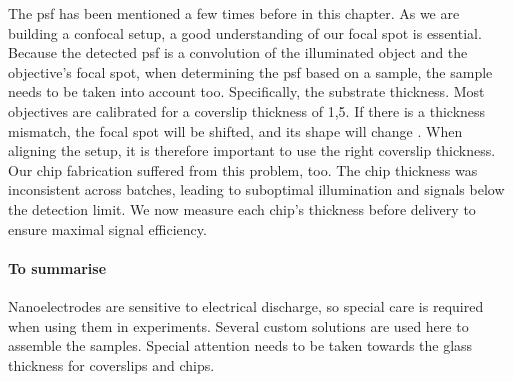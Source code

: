       
        The \gls{psf} has been mentioned a few times before in this chapter. As we are building a confocal setup, a good understanding of our focal spot is essential. Because the detected \gls{psf} is a convolution of the illuminated object and the objective's focal spot, when determining the \gls{psf} based on a sample, the sample needs to be taken into account too. Specifically, the substrate thickness. Most objectives are calibrated for a coverslip thickness of 1,5. If there is a thickness mismatch, the focal spot will be shifted, and its shape will change \cite{nasse2010realistic}. When aligning the setup, it is therefore important to use the right coverslip thickness. Our chip fabrication suffered from this problem, too. The chip thickness was inconsistent across batches, leading to suboptimal illumination and signals below the detection limit. We now measure each chip's thickness before delivery to ensure maximal signal efficiency. 
        
        
	    	
        \paragraph{To summarise}
        Nanoelectrodes are sensitive to electrical discharge, so special care is required when using them in experiments. Several custom solutions are used here to assemble the samples. Special attention needs to be taken towards the glass thickness for coverslips and chips. 
        
